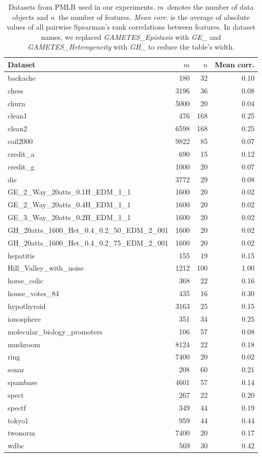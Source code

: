 \documentclass{article}
\theoremstyle{definition}
\begin{document}
\begin{table}[p]
	\centering
	\begin{tabular}{lrrr}
		\toprule
		Dataset & $m$ & $n$ & Mean corr. \\
		\midrule
		backache & 180 & 32 & 0.10 \\
		chess & 3196 & 36 & 0.08 \\
		churn & 5000 & 20 & 0.04 \\
		clean1 & 476 & 168 & 0.25 \\
		clean2 & 6598 & 168 & 0.25 \\
		coil2000 & 9822 & 85 & 0.07 \\
		credit\_a & 690 & 15 & 0.12 \\
		credit\_g & 1000 & 20 & 0.07 \\
		dis & 3772 & 29 & 0.08 \\
		GE\_2\_Way\_20atts\_0.1H\_EDM\_1\_1 & 1600 & 20 & 0.02 \\
		GE\_2\_Way\_20atts\_0.4H\_EDM\_1\_1 & 1600 & 20 & 0.02 \\
		GE\_3\_Way\_20atts\_0.2H\_EDM\_1\_1 & 1600 & 20 & 0.02 \\
		GH\_20atts\_1600\_Het\_0.4\_0.2\_50\_EDM\_2\_001 & 1600 & 20 & 0.02 \\
		GH\_20atts\_1600\_Het\_0.4\_0.2\_75\_EDM\_2\_001 & 1600 & 20 & 0.02 \\
		hepatitis & 155 & 19 & 0.15 \\
		Hill\_Valley\_with\_noise & 1212 & 100 & 1.00 \\
		horse\_colic & 368 & 22 & 0.16 \\
		house\_votes\_84 & 435 & 16 & 0.30 \\
		hypothyroid & 3163 & 25 & 0.15 \\
		ionosphere & 351 & 34 & 0.25 \\
		molecular\_biology\_promoters & 106 & 57 & 0.08 \\
		mushroom & 8124 & 22 & 0.18 \\
		ring & 7400 & 20 & 0.02 \\
		sonar & 208 & 60 & 0.21 \\
		spambase & 4601 & 57 & 0.14 \\
		spect & 267 & 22 & 0.20 \\
		spectf & 349 & 44 & 0.19 \\
		tokyo1 & 959 & 44 & 0.44 \\
		twonorm & 7400 & 20 & 0.17 \\
		wdbc & 569 & 30 & 0.42 \\
		\bottomrule
	\end{tabular}
	\caption{
		Datasets from PMLB used in our experiments.
		$m$~denotes the number of data objects and $n$~the number of features.
		\emph{Mean corr.} is the average of absolute values of all pairwise Spearman's rank correlations between features.
		In dataset names, we replaced \emph{GAMETES\_Epistasis} with  \emph{GE\_} and \emph{GAMETES\_Heterogeneity} with \emph{GH\_} to reduce the table's width.
	}
	\label{tab:afs:datasets}
\end{table}
\end{document}
